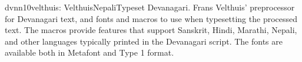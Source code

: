\documentclass{ddltxtyp}
\begin{document}

\begin{package}{dvnn10}{velthuis: VelthuisNepali}{Typeset Devanagari.}
Frans Velthuis' preprocessor for Devanagari text, and fonts and
macros to use when typesetting the processed text. The macros
provide features that support Sanskrit, Hindi, Marathi, Nepali,
and other languages typically printed in the Devanagari script.
The fonts are available both in Metafont and Type 1 format.
\end{package}

\end{document}
